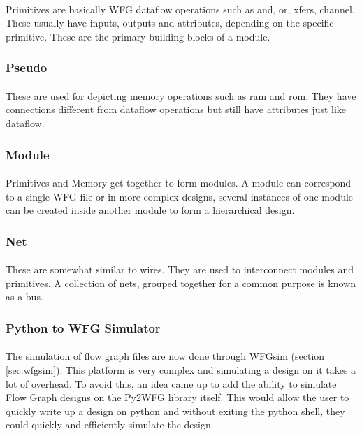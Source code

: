 \paragraph{}
Primitives are basically WFG dataflow operations such as and, or, xfers, channel. These usually have inputs, outputs and attributes, depending on the specific primitive. These are the primary building blocks of a module.

\subsubsection*{Pseudo}
\paragraph{}
These are used for depicting memory operations such as ram and rom. They have connections different from dataflow operations but still have attributes just like dataflow.

\subsubsection*{Module}
\paragraph{}
Primitives and Memory get together to form modules. A module can correspond to a single WFG file or in more complex designs, several instances of one module can be created inside another module to form a hierarchical design.

\subsubsection*{Net}
\paragraph{}
These are somewhat similar to wires. They are used to interconnect modules and primitives. A collection of nets, grouped together for a common purpose is known as a bus.

\subsubsection{Python to WFG Simulator}
\label{sec:py2wfgsim}

\paragraph{}
The simulation of flow graph files are now done through WFGsim (section \ref{sec:wfgsim}). This platform is very complex and simulating a design on it takes a lot of overhead. To avoid this, an idea came up to add the ability to simulate Flow Graph designs on the Py2WFG library itself. This would allow the user to quickly write up a design on python and without exiting the python shell, they could quickly and efficiently simulate the design. 

